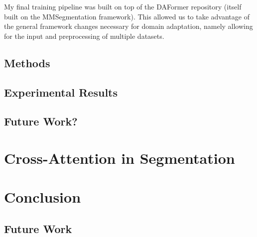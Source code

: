 \documentclass[a4paper,12pt]{report}
\begin{document}
My final training pipeline was built on top of the DAFormer repository (itself built on the MMSegmentation framework). This allowed us to take advantage of the general framework changes necessary for domain adaptation, namely allowing for the input and preprocessing of multiple datasets.


\section{Methods}

\section{Experimental Results}

\section{Future Work?}

\chapter{Cross-Attention in Segmentation}


\FloatBarrier


\chapter{Conclusion}
\section{Future Work}


{}

\end{document}
